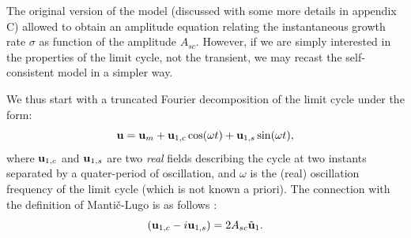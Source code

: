 \documentclass[twocolumn,10pt]{asme2ej}
\newcommand{\be}[1]{ \begin{equation} \label{#1}}
\newcommand{\ee}{\end{equation}}
\begin{document}
The original version of the model (discussed with some more details in appendix C) allowed to obtain an amplitude equation relating the instantaneous growth rate $\sigma$ as function of the amplitude $A_{sc}$. However, if we are simply interested in the properties of the limit cycle, not the transient, we may recast the self-consistent model in a simpler way. 







We thus start with a truncated Fourier decomposition of the limit cycle under the form:
\be{HB}
{\bf u } = {\bf u }_m + {\bf u }_{1,c} \cos( \omega t ) +   {\bf u }_{1,s} \sin( \omega t ),
\ee
where ${\bf u }_{1,c}$ and ${\bf u }_{1,s}$ are two {\em real} fields describing the cycle at two instants separated by a quater-period of oscillation, and $\omega$ is the (real) oscillation frequency of the limit cycle (which is not known a priori).  
The connection with the definition of Manti\v{c}-Lugo is as follows :
\be{HBtoSC}
\left( {\bf u }_{1,c} - i {\bf u }_{1,s} \right) = 2 A_{sc} \tilde{{\bf u }}_1.
\ee 
\end{document}
